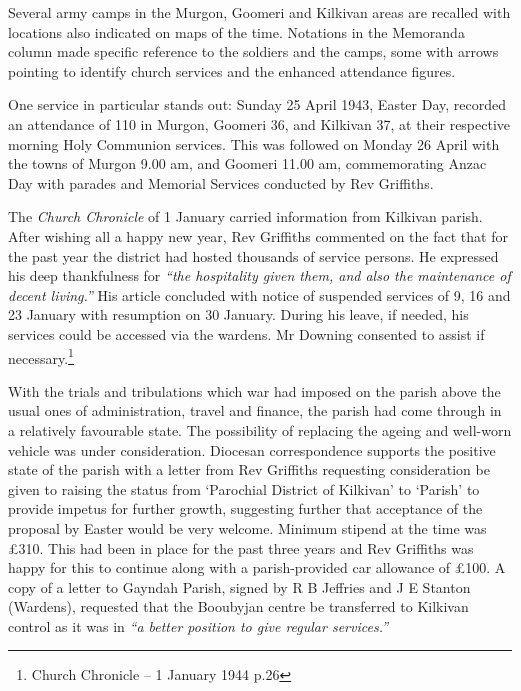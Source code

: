Several army camps in the Murgon, Goomeri and Kilkivan areas are recalled with locations also indicated on maps of the time. Notations in the Memoranda column made specific reference to the soldiers and the camps, some with arrows pointing to identify church services and the enhanced attendance figures.



One service in particular stands out: Sunday 25 April 1943, Easter Day, recorded an attendance of 110 in Murgon, Goomeri 36, and Kilkivan 37, at their respective morning Holy Communion services. This was followed on Monday 26 April with the towns of Murgon 9.00 am, and Goomeri 11.00 am, commemorating Anzac Day with parades and Memorial Services conducted by Rev Griffiths.



The \emph{Church Chronicle} of 1 January carried information from Kilkivan parish. After wishing all a happy new year, Rev Griffiths commented on the fact that for the past year the district had hosted thousands of service persons. He expressed his deep thankfulness for \emph{``the hospitality given them, and also the maintenance of decent living.''} His article concluded with notice of suspended services of 9, 16 and 23 January with resumption on 30 January. During his leave, if needed, his services could be accessed via the wardens. Mr Downing consented to assist if necessary.\footnote{Church Chronicle -- 1 January 1944 p.26}


With the trials and tribulations which war had imposed on the parish above the usual ones of administration, travel and finance, the parish had come through in a relatively favourable state. The possibility of replacing the ageing and well-worn vehicle was under consideration. Diocesan correspondence supports the positive state of the parish with a letter from Rev Griffiths requesting consideration be given to raising the status from `Parochial District of Kilkivan' to `Parish' to provide impetus for further growth, suggesting further that acceptance of the proposal by Easter would be very welcome. Minimum stipend at the time was \pounds310. This had been in place for the past three years and Rev Griffiths was happy for this to continue along with a parish-provided car allowance of \pounds100. A copy of a letter to Gayndah Parish, signed by R B Jeffries and J E Stanton (Wardens), requested that the Booubyjan centre be transferred to Kilkivan control as it was in \emph{``a better position to give regular services.''}



